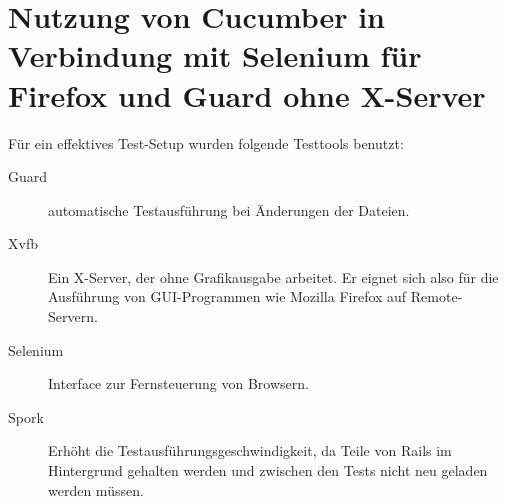 
%

\chapter{Nutzung von Cucumber in Verbindung mit Selenium für Firefox und Guard ohne X-Server}
Für ein effektives Test-Setup wurden folgende Testtools benutzt:
\begin{description}
 \item[Guard] automatische Testausführung bei Änderungen der Dateien.
 \item[Xvfb] Ein X-Server, der ohne Grafikausgabe arbeitet. Er eignet sich also für die Ausführung von GUI-Programmen wie Mozilla Firefox auf Remote-Servern.
 \item[Selenium] Interface zur Fernsteuerung von Browsern.
 \item[Spork] Erhöht die Testausführungsgeschwindigkeit, da Teile von Rails im Hintergrund gehalten werden und zwischen den Tests nicht neu geladen werden müssen.
\end{description}

